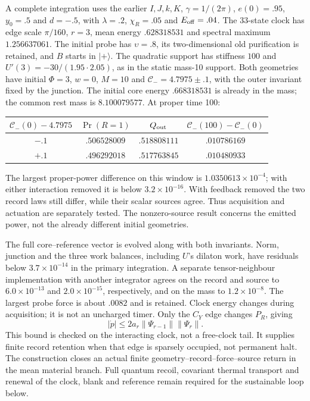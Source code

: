 \documentclass[12pt,a4paper]{article}
\begin{document}
A complete integration uses the earlier $I,J,k,K$, $\gamma=1/(2\pi)$,
$e(0)=.95$, $y_0=.5$ and $d=-.5$, with
$\lambda=.2$, $\chi_R=.05$ and $E_{\rm off}=.04$.
The 33-state clock has edge scale $\pi/160$, $r=3$, mean energy
$.628318531$ and spectral maximum $1.256637061$.
The initial probe has $\upsilon=.8$, its two-dimensional old purification
is retained, and $B$ starts in $|+\rangle$.
The quadratic support has stiffness $100$ and
$U'(3)=-30/(1.95\cdot2.05)$, as in the static mass-10 support.
Both geometries have initial $\Phi=3$, $w=0$, $M=10$ and
$\mathcal C_-=4.7975\pm.1$, with the outer invariant fixed by the junction.
The initial core energy $.668318531$ is already in the mass;
the common rest mass is $8.100079577$. At proper time 100:
\begin{center}
\begin{tabular}{cccc}
\hline
$\mathcal C_-(0)-4.7975$ & $\Pr(R=1)$ & $Q_{\rm out}$
 & $\mathcal C_-(100)-\mathcal C_-(0)$\\
\hline
$-.1$ & $.506528009$ & $.518808111$ & $.010786169$\\
$+.1$ & $.496292018$ & $.517763845$ & $.010480933$\\
\hline
\end{tabular}
\end{center}
The largest proper-power difference on this window is
$1.0350613\times10^{-4}$; with either interaction removed it is below
$3.2\times10^{-16}$. With feedback removed the two record laws still
differ, while their scalar sources agree. Thus acquisition and actuation
are separately tested. The nonzero-source result concerns the emitted
power, not the already different initial geometries.

The full core--reference vector is evolved along with both invariants.
Norm, junction and the three work balances, including $U$'s dilaton work,
have residuals below $3.7\times10^{-14}$ in the primary integration.
A separate tensor-neighbour implementation with another integrator agrees
on the record and source to $6.0\times10^{-13}$ and
$2.0\times10^{-15}$, respectively, and on the mass to $1.2\times10^{-8}$.
The largest probe force is about $.0082$ and is retained.
Clock energy changes during acquisition; it is not an uncharged timer.
Only the $C_Y$ edge changes $P_R$, giving
\[
 |\dot p|\le2a_r\|\Psi_{r-1}\|\|\Psi_r\|.
\]
This bound is checked on the interacting clock, not a free-clock tail.
It supplies finite record retention when that edge is sparsely occupied,
not permanent halt. The construction closes an actual finite
geometry--record--force--source return in the mean material branch.
Full quantum recoil, covariant thermal transport and renewal of the clock,
blank and reference remain required for the sustainable loop below.
\end{document}
